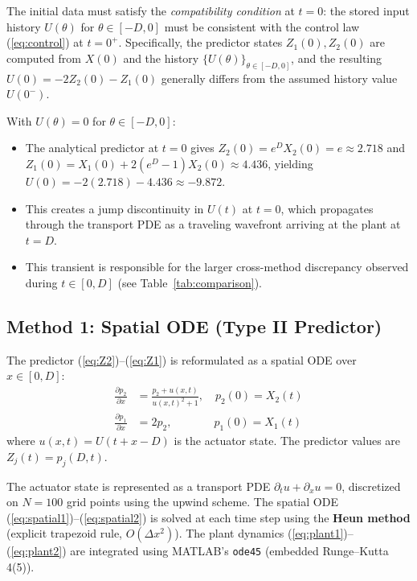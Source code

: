 \documentclass[11pt]{article}
\begin{document}
The initial data must satisfy the \emph{compatibility condition} at $t = 0$: the stored input history $U(\theta)$ for $\theta \in [-D, 0]$ must be consistent with the control law (\ref{eq:control}) at $t = 0^+$. Specifically, the predictor states $Z_1(0), Z_2(0)$ are computed from $X(0)$ and the history $\{U(\theta)\}_{\theta \in [-D,0]}$, and the resulting $U(0) = -2Z_2(0) - Z_1(0)$ generally differs from the assumed history value $U(0^-)$.

With $U(\theta) = 0$ for $\theta \in [-D, 0]$:
\begin{itemize}
\item The analytical predictor at $t = 0$ gives $Z_2(0) = e^D X_2(0) = e \approx 2.718$ and $Z_1(0) = X_1(0) + 2(e^D - 1)X_2(0) \approx 4.436$, yielding $U(0) = -2(2.718) - 4.436 \approx -9.872$.
\item This creates a jump discontinuity in $U(t)$ at $t = 0$, which propagates through the transport PDE as a traveling wavefront arriving at the plant at $t = D$.
\item This transient is responsible for the larger cross-method discrepancy observed during $t \in [0, D]$ (see Table~\ref{tab:comparison}).
\end{itemize}

\subsection{Method 1: Spatial ODE (Type II Predictor)}

The predictor (\ref{eq:Z2})--(\ref{eq:Z1}) is reformulated as a spatial ODE over $x \in [0, D]$:
\begin{align}
\frac{\partial p_2}{\partial x} &= \frac{p_2 + u(x,t)}{u(x,t)^2 + 1}, \quad p_2(0) = X_2(t) \label{eq:spatial1} \\
\frac{\partial p_1}{\partial x} &= 2p_2, \quad\quad\quad\;\;\, p_1(0) = X_1(t) \label{eq:spatial2}
\end{align}
where $u(x,t) = U(t + x - D)$ is the actuator state. The predictor values are $Z_j(t) = p_j(D, t)$.

The actuator state is represented as a transport PDE $\partial_t u + \partial_x u = 0$, discretized on $N = 100$ grid points using the upwind scheme. The spatial ODE (\ref{eq:spatial1})--(\ref{eq:spatial2}) is solved at each time step using the \textbf{Heun method} (explicit trapezoid rule, $O(\Delta x^2)$). The plant dynamics (\ref{eq:plant1})--(\ref{eq:plant2}) are integrated using MATLAB's \texttt{ode45} (embedded Runge--Kutta 4(5)).
\end{document}
